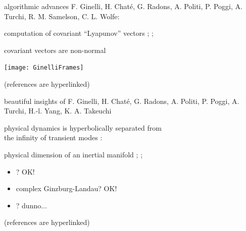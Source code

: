 \begin{frame}{algorithmic advances}
\bigskip
F. Ginelli, H. Chat\'e, G. Radons, A. Politi,
P. Poggi, A. Turchi, R. M. Samelson,
C. L. Wolfe:
            \begin{block}{computation of covariant ``Lyapunov'' vectors}
;
;\\
            \end{block}
\begin{block}{
covariant vectors are non-normal
}
\begin{center}
\texttt{[image: GinelliFrames]}
\end{center}
\end{block}


\vfill\hfill
{\scriptsize \color{yellow} (references are hyperlinked)}
\end{frame}

\begin{frame}{beautiful insights of}
F. Ginelli, H. Chat\'e, G. Radons, A. Politi,
P. Poggi, A. Turchi, H.-l. Yang,
K. A. Takeuchi

\bigskip
{\color{red} physical dynamics} is hyperbolically separated
from \\ the infinity of {\color{red} transient modes} :

            \begin{block}{physical dimension of an inertial manifold}
{\scriptsize
{};
;\\
}
            \end{block}

\bigskip

\begin{itemize}
  \item \KS? OK!
  \item complex Ginzburg-Landau? OK!
  \item \NS? dunno...
\end{itemize}

\vfill\hfill
{\scriptsize \color{yellow} (references are hyperlinked)}
\end{frame}

